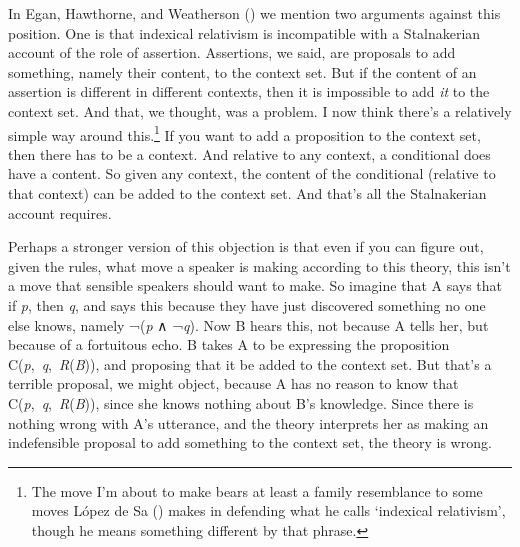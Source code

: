 \documentclass[
  11pt,
  letterpaper,
  DIV=11,
  numbers=noendperiod,
  twoside]{scrartcl}
\begin{document}
In Egan, Hawthorne, and Weatherson
() we mention two arguments against
this position. One is that indexical relativism is incompatible with a
Stalnakerian account of the role of assertion. Assertions, we said, are
proposals to add something, namely their content, to the context set.
But if the content of an assertion is different in different contexts,
then it is impossible to add \emph{it} to the context set. And that, we
thought, was a problem. I now think there's a relatively simple way
around this.\footnote{The move I'm about to make bears at least a family
  resemblance to some moves López de Sa
  () makes in defending what he calls
  `indexical relativism', though he means something different by that
  phrase.} If you want to add a proposition to the context set, then
there has to be a context. And relative to any context, a conditional
does have a content. So given any context, the content of the
conditional (relative to that context) can be added to the context set.
And that's all the Stalnakerian account requires.

Perhaps a stronger version of this objection is that even if you can
figure out, given the rules, what move a speaker is making according to
this theory, this isn't a move that sensible speakers should want to
make. So imagine that A says that if \emph{p}, then \emph{q}, and says
this because they have just discovered something no one else knows,
namely ¬(\emph{p} ∧ ¬\emph{q}). Now B hears this, not because A tells
her, but because of a fortuitous echo. B takes A to be expressing the
proposition C(\emph{p},~\emph{q},~\emph{R}(\emph{B})), and proposing
that it be added to the context set. But that's a terrible proposal, we
might object, because A has no reason to know that
C(\emph{p},~\emph{q},~\emph{R}(\emph{B})), since she knows nothing about
B's knowledge. Since there is nothing wrong with A's utterance, and the
theory interprets her as making an indefensible proposal to add
something to the context set, the theory is wrong.
\end{document}
